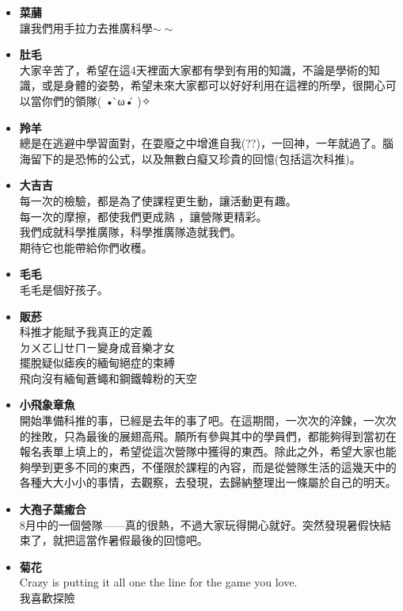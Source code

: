 \begin{itemize}
\item \textbf{菜䔕} \\
讓我們用手拉力去推廣科學$\sim\sim$

\item \textbf{肚毛} \\
大家辛苦了，希望在這4天裡面大家都有學到有用的知識，不論是學術的知識，或是身體的姿勢，希望未來大家都可以好好利用在這裡的所學，很開心可以當你們的領隊( • ̀ω•́ )✧

\item \textbf{羚羊} \\
總是在逃避中學習面對，在耍廢之中增進自我(??)，一回神，一年就過了。腦海留下的是恐怖的公式，以及無數白癡又珍貴的回憶(包括這次科推)。

\item \textbf{大吉吉} \\
每一次的檢驗，都是為了使課程更生動，讓活動更有趣。\\
每一次的摩擦，都使我們更成熟 ，讓營隊更精彩。\\
我們成就科學推廣隊，科學推廣隊造就我們。\\
期待它也能帶給你們收穫。

\item \textbf{毛毛} \\
毛毛是個好孩子。
\item \textbf{販菸} \\
科推才能賦予我真正的定義 \\
ㄉㄨㄛㄩㄝㄇㄧ變身成音樂才女 \\
擺脫疑似瘧疾的緬甸絕症的束縛 \\
飛向沒有緬甸蒼蠅和鋼鐵韓粉的天空

\item \textbf{小飛象章魚} \\
開始準備科推的事，已經是去年的事了吧。在這期間，一次次的淬鍊，一次次的挫敗，只為最後的展翅高飛。願所有參與其中的學員們，都能夠得到當初在報名表單上填上的，希望從這次營隊中獲得的東西。除此之外，希望大家也能夠學到更多不同的東西，不僅限於課程的內容，而是從營隊生活的這幾天中的各種大大小小的事情，去觀察，去發現，去歸納整理出一條屬於自己的明天。

\item \textbf{大孢子葉癒合} \\
8月中的一個營隊——真的很熱，不過大家玩得開心就好。突然發現暑假快結束了，就把這當作暑假最後的回憶吧。

\item \textbf{菊花} \\
Crazy is putting it all one the line for the game you love. \\
我喜歡探險


\end{itemize}
